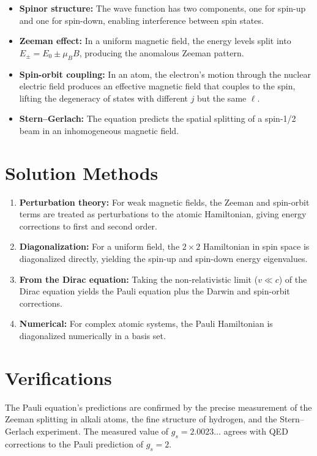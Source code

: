 \begin{itemize}
  \item \textbf{Spinor structure:} The wave function has two components, one for spin-up and one for spin-down, enabling interference between spin states.
  \item \textbf{Zeeman effect:} In a uniform magnetic field, the energy levels split into $E_{\pm} = E_{0} \pm \mu_{B}B$, producing the anomalous Zeeman pattern.
  \item \textbf{Spin-orbit coupling:} In an atom, the electron's motion through the nuclear electric field produces an effective magnetic field that couples to the spin, lifting the degeneracy of states with different $j$ but the same $\ell$.
  \item \textbf{Stern--Gerlach:} The equation predicts the spatial splitting of a spin-1/2 beam in an inhomogeneous magnetic field.
\end{itemize}
\section*{Solution Methods}

\begin{enumerate}
  \item \textbf{Perturbation theory:} For weak magnetic fields, the Zeeman and spin-orbit terms are treated as perturbations to the atomic Hamiltonian, giving energy corrections to first and second order.
  \item \textbf{Diagonalization:} For a uniform field, the $2\times 2$ Hamiltonian in spin space is diagonalized directly, yielding the spin-up and spin-down energy eigenvalues.
  \item \textbf{From the Dirac equation:} Taking the non-relativistic limit ($v \ll c$) of the Dirac equation yields the Pauli equation plus the Darwin and spin-orbit corrections.
  \item \textbf{Numerical:} For complex atomic systems, the Pauli Hamiltonian is diagonalized numerically in a basis set.
\end{enumerate}
\section*{Verifications}

The Pauli equation's predictions are confirmed by the precise measurement of the Zeeman splitting in alkali atoms, the fine structure of hydrogen, and the Stern--Gerlach experiment. The measured value of $g_{s} = 2.0023\ldots$ agrees with QED corrections to the Pauli prediction of $g_{s} = 2$.
